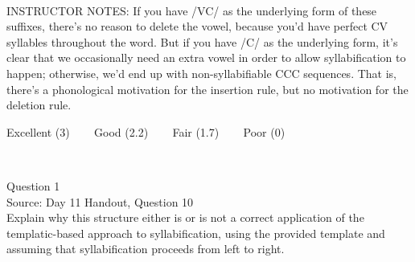 \documentclass[12pt]{article}
\begin{document}
~\\
INSTRUCTOR NOTES: If you have /VC/ as the underlying form of these suffixes, there’s no reason to delete the vowel, because you'd have perfect CV syllables throughout the word. But if you have /C/ as the underlying form, it’s clear that we occasionally need an extra vowel in order to allow syllabification to happen; otherwise, we’d end up with non-syllabifiable CCC sequences. That is, there’s a phonological motivation for the insertion rule, but no motivation for the deletion rule.


\vfill
Excellent (3) ~~~ Good (2.2) ~~~ Fair (1.7) ~~~ Poor (0)
\newpage

\begin{center}
\textbf{{\color{red}{\HUGE END OF EXAM}}}\\

\end{center}
\newpage

\begin{center}
\textbf{{\color{blue}{\HUGE START OF EXAM\\}}}

\textbf{{\color{blue}{\HUGE Student ID: 9246\\}}}

\textbf{{\color{blue}{\HUGE 2:40 - 3:00 PM\\}}}

\end{center}
\newpage

{\large Question 1}\\

Source: Day 11 Handout, Question 10\\

Explain why this structure either is or is not a correct application of the templatic-based approach to syllabification, using the provided template and assuming that syllabification proceeds from left to right.\\
\end{document}
